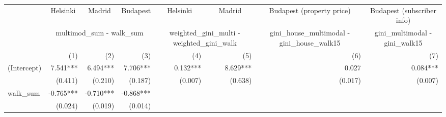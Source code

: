\begin{tabular}{lrrrrrrr}
\toprule
                                           & \multicolumn{1}{c}{Helsinki} & \multicolumn{1}{c}{Madrid} & \multicolumn{1}{c}{Budapest} &   \multicolumn{1}{c}{Helsinki}   &   \multicolumn{1}{c}{Madrid}   &           \multicolumn{1}{c}{Budapest (property price)}           &    \multicolumn{1}{c}{Budapest (subscriber info)}   \\ 
\cmidrule(lr){2-2} \cmidrule(lr){3-3} \cmidrule(lr){4-4} \cmidrule(lr){5-5} \cmidrule(lr){6-6} \cmidrule(lr){7-7} \cmidrule(lr){8-8} 
                                           &                       \multicolumn{3}{c}{multimod\_sum - walk\_sum}                      &  \multicolumn{2}{c}{weighted\_gini\_multi - weighted\_gini\_walk} & \multicolumn{1}{c}{gini\_house\_multimodal - gini\_house\_walk15} & \multicolumn{1}{c}{gini\_multimodal - gini\_walk15} \\ 
\cmidrule(lr){2-4} \cmidrule(lr){5-6} \cmidrule(lr){7-7} \cmidrule(lr){8-8} 
                                           &                          (1) &                        (2) &                          (3) &                              (4) &                            (5) &                                                               (6) &                                                 (7) \\ 
\midrule
(Intercept)                                &                     7.541*** &                   6.494*** &                     7.706*** &                         0.132*** &                       8.629*** &                                                             0.027 &                                            0.084*** \\ 
                                           &                      (0.411) &                    (0.210) &                      (0.187) &                          (0.007) &                        (0.638) &                                                           (0.017) &                                             (0.007) \\ 
walk\_sum                                  &                    -0.765*** &                  -0.710*** &                    -0.868*** &                                  &                                &                                                                   &                                                     \\ 
                                           &                      (0.024) &                    (0.019) &                      (0.014) &                                  &                                &                                                                   &                                                     \\ 

\end{tabular}
